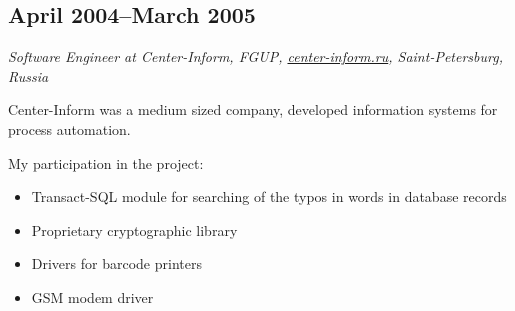\subsection*{April 2004--March 2005}

\textit{Software Engineer at Center-Inform, FGUP,
\href{http://center-inform.ru/}{\url{center-inform.ru}},
Saint-Petersburg, Russia}

Center-Inform was a medium sized company, developed information
systems for process automation.

My participation in the project:
\begin{itemize}[noitemsep, nosep]
  \item Transact-SQL module for searching of the typos in words in
database records
  \item Proprietary cryptographic library
  \item Drivers for barcode printers
  \item GSM modem driver
\end{itemize}

